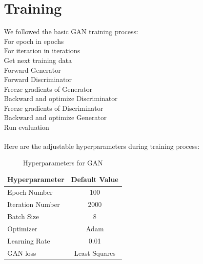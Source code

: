 \documentclass[letterpaper]{article}
\begin{document}
\section{Training}
We followed the basic GAN training process:
\smallskip \noindent
\\
\hspace*{3mm} For epoch in epochs\\
\hspace*{6mm} For iteration in iterations\\
\hspace*{9mm} Get next training data\\
\hspace*{9mm} Forward Generator\\
\hspace*{9mm} Forward Discriminator\\
\hspace*{9mm} Freeze gradients of Generator\\
\hspace*{9mm} Backward and optimize Discriminator\\
\hspace*{9mm} Freeze gradients of Discriminator\\
\hspace*{9mm} Backward and optimize Generator\\
\hspace*{3mm} Run evaluation\\
\\
\smallskip \noindent
Here are the adjustable hyperparameters during training process:
\begin{table}[h]
    \centering
    \begin{tabular}{|l|c|}
        \hline
        Hyperparameter&Default Value\\
        \hline
        Epoch Number&100\\
        Iteration Number&2000\\
        Batch Size&8\\
        Optimizer&Adam\\
        Learning Rate&0.01\\
        GAN loss&Least Squares\\
        \hline
    \end{tabular}
    \caption{Hyperparameters for GAN}
\end{table}
\end{document}
